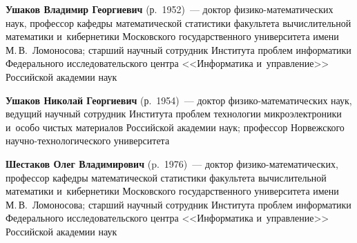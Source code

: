 \begin{multicols}{2}
\noindent
\textbf{Ушаков Владимир Георгиевич} (р.\ 1952)~--- доктор фи\-зи\-ко-ма\-те\-ма\-ти\-че\-ских наук, 
профессор кафедры
математической статистики факультета вычислительной математики и~кибернетики Московского
государственного университета имени М.\,В.~Ломоносова; старший научный сотрудник Института
проблем информатики Федерального исследовательского центра <<Информатика и~управ\-ле\-ние>>
Российской академии наук

\vspace*{3pt}

\noindent
\textbf{Ушаков Николай Георгиевич} (р.\ 1954)~--- доктор
фи\-зи\-ко-ма\-те\-ма\-ти\-че\-ских наук, ведущий научный
сотруд\-ник Института проб\-лем технологии микроэлектроники 
и~особо чистых материалов Российской академии наук; профессор
Норвежского на\-уч\-но-тех\-но\-ло\-ги\-че\-ско\-го университета %

\vspace*{3pt}
  
\noindent
\textbf{Шестаков Олег Владимирович} (p.\ 1976)~--- доктор фи\-зи\-ко-ма\-те\-ма\-ти\-че\-ских, 
профессор ка\-фед\-ры математической статистики факультета вычисли\-тельной математики 
и~кибернетики Московского государственного университета имени М.\,В.~Ломоносова; 
старший научный сотрудник Института проб\-лем информатики Федерального исследовательского цент\-ра 
<<Информатика и~управ\-ле\-ние>> Российской академии наук
   





\def\leftkol{ОБ АВТОРАХ}

\def\rightkol{ОБ АВТОРАХ}


 \label{end\stat}



\end{multicols}

\def\leftkol{ОБ АВТОРАХ}
\def\rightkol{ОБ АВТОРАХ}

\newpage